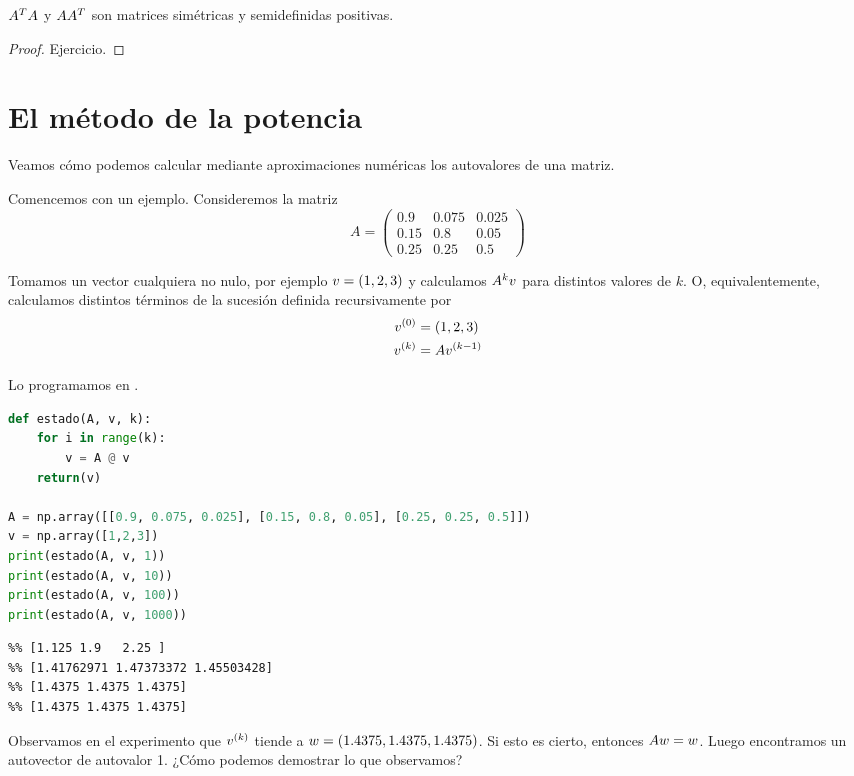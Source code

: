 \begin{prop}
 $\Ab^T\Ab$ y $\Ab\Ab^T$ son matrices simétricas y semidefinidas positivas.
 \end{prop}

\begin{proof}Ejercicio.\end{proof}

\section{El método de la potencia}

Veamos cómo podemos calcular mediante aproximaciones numéricas los autovalores de una matriz.

Comencemos con un ejemplo. Consideremos la matriz
$$
A = \begin{pmatrix}
0.9 & 0.075 & 0.025 \\
0.15 & 0.8 &  0.05 \\
0.25 & 0.25 & 0.5
\end{pmatrix}
$$

Tomamos un vector cualquiera no nulo, por ejemplo $\vb = (1, 2, 3)$ y calculamos $\Ab^k \vb$ para distintos valores de $k$.
O, equivalentemente, calculamos distintos términos de la sucesión definida recursivamente por
$$
\begin{aligned}
\vb^{(0)} &= (1,2,3) \\
\vb^{(k)} &= \Ab \vb^{(k-1)}
\end{aligned}
$$

Lo programamos en \python.

\begin{Shaded}
\begin{lstlisting}[language=python]
def estado(A, v, k):
    for i in range(k):
        v = A @ v
    return(v)

A = np.array([[0.9, 0.075, 0.025], [0.15, 0.8, 0.05], [0.25, 0.25, 0.5]])
v = np.array([1,2,3])
print(estado(A, v, 1))
print(estado(A, v, 10))
print(estado(A, v, 100))
print(estado(A, v, 1000))
\end{lstlisting}
\end{Shaded}

\begin{verbatim}
%% [1.125 1.9   2.25 ]
%% [1.41762971 1.47373372 1.45503428]
%% [1.4375 1.4375 1.4375]
%% [1.4375 1.4375 1.4375]
\end{verbatim}

Observamos en el experimento que $\vb^{(k)}$ tiende a $\wb = (1.4375, 1.4375, 1.4375)$. Si esto es cierto, entonces $\Ab \wb = \wb$. Luego encontramos un autovector de autovalor 1. ¿C\'omo podemos demostrar lo que observamos?


